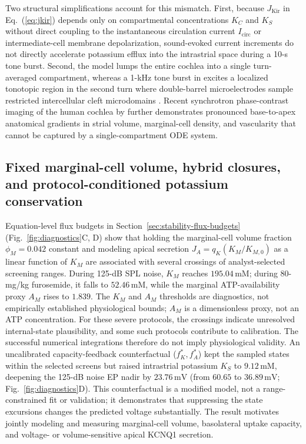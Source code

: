 \documentclass[final,5p,times]{elsarticle}
\begin{document}
Two structural simplifications account for this mismatch. First, because \(J_{\mathrm{Kir}}\) in Eq.~(\ref{eq:jkir}) depends only on compartmental concentrations \(K_C\) and \(K_S\) without direct coupling to the instantaneous circulation current \(I_{\mathrm{circ}}\) or intermediate-cell membrane depolarization, sound-evoked current increments do not directly accelerate potassium efflux into the intrastrial space during a 10-s tone burst. Second, the model lumps the entire cochlea into a single turn-averaged compartment, whereas a 1-kHz tone burst in \citet{Zhang2021} excites a localized tonotopic region in the second turn where double-barrel microelectrodes sample restricted intercellular cleft microdomains \citep{NinHibino2016}. Recent synchrotron phase-contrast imaging of the human cochlea by \citet{Creff2026} further demonstrates pronounced base-to-apex anatomical gradients in strial volume, marginal-cell density, and vascularity that cannot be captured by a single-compartment ODE system.

\subsection{Fixed marginal-cell volume, hybrid closures, and protocol-conditioned potassium conservation}\label{sec:limitations-closures}

Equation-level flux budgets in Section~\ref{sec:stability-flux-budgets} (Fig.~\ref{fig:diagnostics}C, D) show that holding the marginal-cell volume fraction \(\phi_M=0.042\) constant and modeling apical secretion \(J_A=q_K(K_M/K_{M,0})\) as a linear function of \(K_M\) are associated with several crossings of analyst-selected screening ranges. During 125-dB SPL noise, \(K_M\) reaches \(195.04\,\mathrm{mM}\); during 80-mg/kg furosemide, it falls to \(52.46\,\mathrm{mM}\), while the marginal ATP-availability proxy \(A_M\) rises to \(1.839\). The \(K_M\) and \(A_M\) thresholds are diagnostics, not empirically established physiological bounds; \(A_M\) is a dimensionless proxy, not an ATP concentration. For these severe protocols, the crossings indicate unresolved internal-state plausibility, and some such protocols contribute to calibration. The successful numerical integrations therefore do not imply physiological validity. An uncalibrated capacity-feedback counterfactual (\(f_K^*,f_A^*\)) kept the sampled states within the selected screens but raised intrastrial potassium \(K_S\) to \(9.12\,\mathrm{mM}\), deepening the 125-dB noise EP nadir by \(23.76\,\mathrm{mV}\) (from \(60.65\) to \(36.89\,\mathrm{mV}\); Fig.~\ref{fig:diagnostics}D). This counterfactual is a modified model, not a range-constrained fit or validation; it demonstrates that suppressing the state excursions changes the predicted voltage substantially. The result motivates jointly modeling and measuring marginal-cell volume, basolateral uptake capacity, and voltage- or volume-sensitive apical KCNQ1 secretion.
\end{document}

